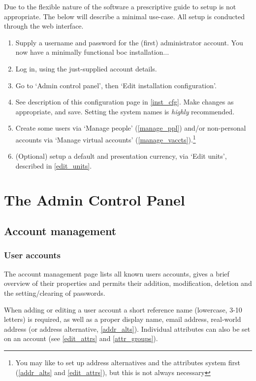 \documentclass{report}
\begin{document}
Due to the flexible nature of the software a prescriptive guide to setup is not appropriate.  The below will describe a minimal use-case.  All setup is conducted through the web interface.

\begin{enumerate}
\item Supply a username and password for the (first) administrator account.  You now have a minimally functional boc installation...
\item Log in, using the just-supplied account details.
\item Go to `Admin control panel', then `Edit installation configuration'.
\item See description of this configuration page in \autoref{inst_cfg}.  Make changes as appropriate, and save.  Setting the system names is \emph{highly} recommended.
\item Create some users via `Manage people' (\autoref{manage_ppl}) and/or non-personal accounts via `Manage virtual accounts' (\autoref{manage_vaccts}).\footnote{You may like to set up address alternatives and the attributes system first (\autoref{addr_alts} and \autoref{edit_attrs}), but this is not always necessary}
\item (Optional) setup a default and presentation currency, via `Edit units', described in \autoref{edit_units}.
\end{enumerate}

\chapter{The Admin Control Panel}

\section{Account management}

\subsection{User accounts}\label{manage_ppl}

The account management page lists all known users accounts, gives a brief overview of their properties and permits their addition, modification, deletion and the setting/clearing of passwords.

When adding or editing a user account a short reference name (lowercase, 3-10 letters) is required, as well as a proper display name, email address, real-world address (or address alternative, \autoref{addr_alts}).  Individual attributes can also be set on an account (see \autoref{edit_attrs} and \autoref{attr_groups}).
\end{document}
